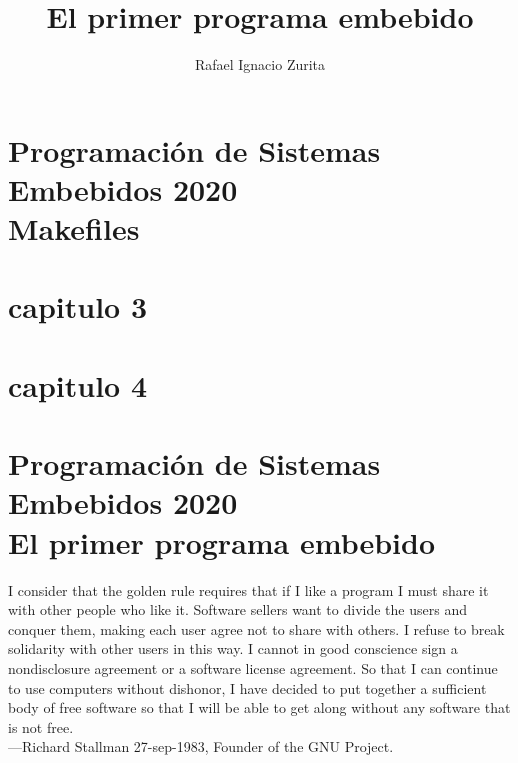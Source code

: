 \documentclass[output=paper, 
colorlinks,
citecolor=brown,
newtxmath
]{langscibook}
\author{Rafael Ignacio Zurita\affiliation{Universidad Nacional del Comahue}}
\title{El primer programa embebido}
\begin{document}

\chapterfont{\Large\color{LightBlue}} 
\chapter*{Programación de Sistemas Embebidos 2020\\ Makefiles}
{\def\addcontentsline#1#2#3{}\maketitle}
\chapter*{capitulo 3}
{\def\addcontentsline#1#2#3{}\maketitle}
\chapter*{capitulo 4}
{\def\addcontentsline#1#2#3{}\maketitle}

\chapter*{Programación de Sistemas Embebidos 2020\\ El primer programa embebido}

\begingroup
\let\clearpage\relax
\cleardoublepage
\hypersetup{linkcolor=blue}
\tableofcontents
\let\clearpage\relax
\cleardoublepage
\endgroup



{\def\addcontentsline#1#2#3{}\maketitle}


\setcounter{page}{1}


\hfill\begin{minipage}{0.8\linewidth} \footnotesize
I consider that the golden rule requires that if I like a program I 
must share it with other people who like it. 
Software sellers want to divide the users and conquer them, making 
each user agree not to share with others. I refuse to break solidarity 
with other users in this way. I cannot in good conscience sign a
nondisclosure agreement or a software license agreement. 
So that I can continue to use computers
without dishonor, I have decided to put together a sufficient body of free software so that I will be able
to get along without any software that is not free.\\
—Richard Stallman 27-sep-1983, Founder of the GNU Project.
\end{minipage}
\end{document}
